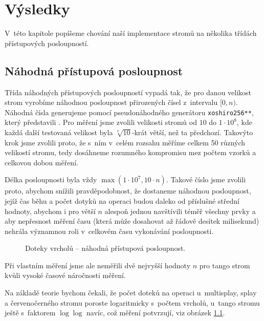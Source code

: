 \chapter{Výsledky}

V~této kapitole popíšeme chování naší implementace stromů na několika třídách přístupových posloupností.

\section{Náhodná přístupová posloupnost}

Třída náhodných přístupových posloupností vypadá tak, že pro danou velikost
strom vyrobíme náhodnou posloupnost přirozených čísel z~intervalu $[0,n)$.
Náhodná čísla generujeme pomocí pseudonáhodného generátoru {\tt xoshiro256**},
který představili \citet{xoshiro}. Pro měření jsme zvolili velikosti stromů od $10$ do $1\cdot
10^8$, kde každá další testovaná velikost byla $\sqrt[7]{10}$-krát větší, než ta předchozí. Takovýto krok
jsme zvolili proto, že s~ním v~celém rozsahu měříme celkem 50 různých velikostí
stromu, tedy dosáhneme rozumného kompromisu mez počtem vzorků a celkovou
dobou měření. 

Délka posloupnosti byla vždy $\max(1\cdot10^7, 10\cdot n)$.
Takové číslo jsme zvolili proto, abychom snížili pravděpodobnost, že dostaneme
náhodnou posloupnost, jejíž čas běhu a počet dotyků na operaci budou daleko od
příslušné střední hodnoty, abychom i pro větší $n$ alespoň jednou navštívili
téměř všechny prvky a aby
nepřesnost měření času (která může dosahovat až řádově desítek milisekund)
nehrála významnou roli v~celkovém času vykonávání posloupnosti. 

\def\graphfigure#1#2{
\begin{figure}[h!]
\centering
\caption{#2}
\label{obr:#1}
\end{figure}
}

\graphfigure{touch_r}{Doteky vrcholů -- náhodná přístupová posloupnost.}


Při vlastním měření jsme ale neměřili dvě nejvyšší hodnoty $n$ pro tango strom kvůli vysoké časové náročnosti měření.

Na základě teorie bychom čekali, že počet doteků na operaci u~multisplay, splay a červenočerného stromu poroste logaritmicky s~počtem vrcholů, u~tango stromu ještě s~faktorem $\log\log$ navíc, což měření potvrzují, viz obrázek \ref{obr:touch_r}.
\let\oldlog\log
\def\log{\oldlog_2}

